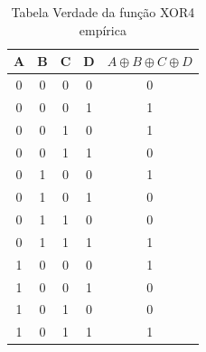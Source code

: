 \documentclass[12pt]{article}
\begin{document}
\begin{table}[H]

    \centering

    \caption{Tabela Verdade da função XOR4 empírica}

    \label{tab:tabela-xor-6}

    \begin{tabular}{|c|c|c|c|c|}

        \hline

        A & B & C & D & \(A \oplus B \oplus C \oplus D\)\\

        \hline

        0 & 0 & 0 & 0 & 0 \\

        \hline

        0 & 0 & 0 & 1 & 1 \\

        \hline

        0 & 0 & 1 & 0 & 1 \\

        \hline

        0 & 0 & 1 & 1 & 0 \\

        \hline

        0 & 1 & 0 & 0 & 1 \\

        \hline

        0 & 1 & 0 & 1 & 0 \\

        \hline

        0 & 1 & 1 & 0 & 0 \\

        \hline

        0 & 1 & 1 & 1 & 1 \\

        \hline

        1 & 0 & 0 & 0 & 1 \\

        \hline

        1 & 0 & 0 & 1 & 0 \\

        \hline

        1 & 0 & 1 & 0 & 0 \\

        \hline

        1 & 0 & 1 & 1 & 1 \\


\end{tabular}
\end{table}
\end{document}
